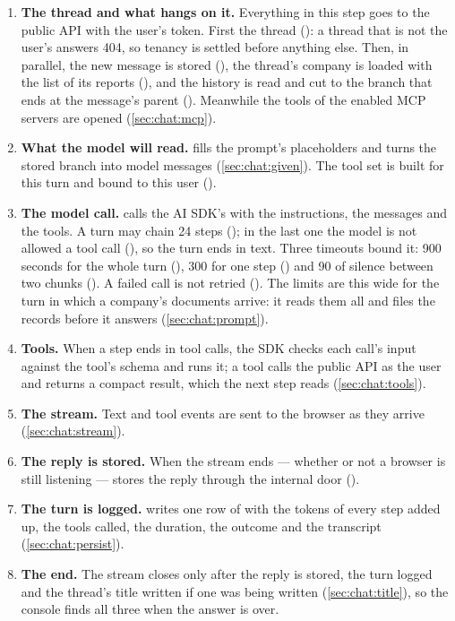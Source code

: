 \begin{enumerate}
    .
  \item \textbf{The thread and what hangs on it.} Everything in this step goes to the public
    API with the user's token. First the thread (): a thread that
    is not the user's answers 404, so tenancy is settled before anything else. Then, in
    parallel, the new message is stored (), the thread's company is
    loaded with the list of its reports (), and the history is read and cut
    to the branch that ends at the message's parent (). Meanwhile the tools of
    the enabled MCP servers are opened (\cref{sec:chat:mcp}).
  \item \textbf{What the model will read.}  fills the prompt's
    placeholders and  turns the stored branch into model messages
    (\cref{sec:chat:given}). The tool set is built for this turn and bound to this user
    ().
  \item \textbf{The model call.}  calls the AI SDK's  with
    the instructions, the messages and the tools. A turn may chain 24 steps ();
    in the last one the model is not allowed a tool call (), so the
    turn ends in text. Three timeouts bound it: 900 seconds for the whole turn
    (), 300 for one step () and 90 of silence
    between two chunks (). A failed call is not retried
    (). The limits are this wide for the turn in which a company's
    documents arrive: it reads them all and files the records before it answers
    (\cref{sec:chat:prompt}).
  \item \textbf{Tools.} When a step ends in tool calls, the SDK checks each call's input against
    the tool's schema and runs it; a tool calls the public API as the user and returns a
    compact result, which the next step reads (\cref{sec:chat:tools}).
  \item \textbf{The stream.} Text and tool events are sent to the browser as they arrive
    (\cref{sec:chat:stream}).
  \item \textbf{The reply is stored.} When the stream ends --- whether or not a browser is
    still listening ---  stores the reply through the internal door
    ().
  \item \textbf{The turn is logged.}  writes one row of  with the
    tokens of every step added up, the tools called, the duration, the outcome and the
    transcript (\cref{sec:chat:persist}).
  \item \textbf{The end.} The stream closes only after the reply is stored, the turn logged and
    the thread's title written if one was being written (\cref{sec:chat:title}), so the console
    finds all three when the answer is over.
\end{enumerate}

